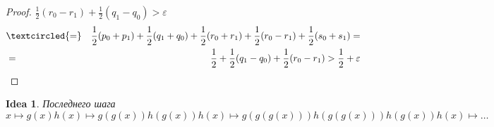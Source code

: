 \documentclass[a4paper]{article}
\theoremstyle{definition}
\theoremstyle{plain}
\newtheorem{idea}{Idea}
\begin{document}
\begin{proof}
	$\frac{1}{2}(r_0 - r_1) + \frac{1}{2}(q_1 - q_0) > \varepsilon$~\\
	
	\begin{eqnarray*}
		& \textcircled{=} & \frac{1}{2}(p_0 + p_1) + \frac{1}{2}(q_1 + q_0) + \frac{1}{2}(r_0 + r_1) + \frac{1}{2}(r_0 - r_1) + \frac{1}{2}(s_0 + s_1) = \nonumber \\
		& = & \frac{1}{2} + \frac{1}{2}(q_1 - q_0) + \frac{1}{2}(r_0 - r_1) > \frac{1}{2} + \varepsilon
	\end{eqnarray*}		
	
\end{proof}

\begin{idea} Последнего шага~\\
	$x \mapsto g(x)h(x) \mapsto g(g(x))h(g(x))h(x) \mapsto g(g(g(x)))h(g(g(x)))h(g(x))h(x) \mapsto \ldots$
\end{idea}
\end{document}
